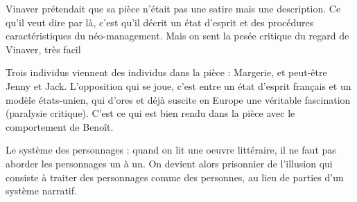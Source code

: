 \documentclass[a4paper,12pt]{book}
\begin{document}
Vinaver prétendait que sa pièce n'était pas une satire mais une description. Ce qu'il veut dire par là, c'est qu'il décrit un état d'esprit et des procédures caractéristiques du néo-management. Mais on sent la pesée critique du regard de Vinaver, très facil
\par Trois individus viennent des individus dans la pièce : Margerie, et peut-être Jenny et Jack. L'opposition qui se joue, c'est entre un état d'esprit français et un modèle états-unien, qui d'ores et déjà suscite en Europe une véritable fascination (paralysie critique). C'est ce qui est bien rendu dans la pièce avec le comportement de Benoît.
\par Le système des personnages : quand on lit une oeuvre littéraire, il ne faut pas aborder les personnages un à un. On devient alors prisonnier de l'illusion qui consiste à traiter des personnages comme des personnes, au lieu de parties d'un système narratif.
\end{document}
